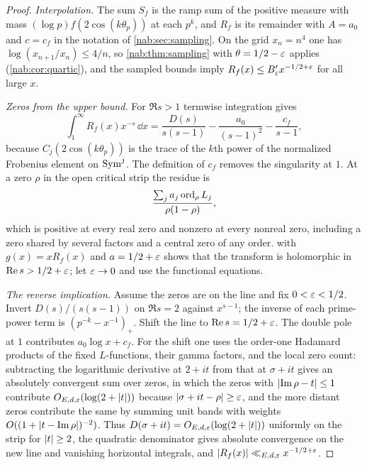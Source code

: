 \begin{proof}
\emph{Interpolation.} The sum $S_f$ is the ramp sum of the positive measure with mass
$(\log p)f(2\cos(k\theta_p))$ at each $p^k$, and $R_f$ is its remainder with $A=a_0$ and $c=c_f$ in
the notation of \cref{nab:sec:sampling}. On the grid $x_n=n^4$ one has $\log(x_{n+1}/x_n)\le4/n$, so
\cref{nab:thm:sampling} with $\theta=1/2-\varepsilon$ applies (\cref{nab:cor:quartic}), and the sampled bounds
imply $R_f(x)\le B'_\varepsilon x^{-1/2+\varepsilon}$ for all large $x$.

\emph{Zeros from the upper bound.} For $\Re s>1$ termwise integration gives
\begin{equation}\label{hec:eq:symmellin}
 \int_1^\infty R_f(x)x^{-s}\,\dd x=\frac{D(s)}{s(s-1)}-\frac{a_0}{(s-1)^2}-\frac{c_f}{s-1},
\end{equation}
because $C_j(2\cos(k\theta_p))$ is the trace of the $k$th power of the normalized Frobenius element on
$\operatorname{Sym}^j$. The definition of $c_f$ removes the singularity at $1$. At a zero $\rho$ in the open critical
strip the residue is
\[
 \frac{\sum_ja_j\operatorname{ord}_\rho L_j}{\rho(1-\rho)},
\]
which is positive at every real zero and nonzero at every nonreal zero, including a zero shared by several
factors and a central zero of any order.  with $g(x)=xR_f(x)$ and $a=1/2+\varepsilon$ shows
that the transform is holomorphic in $\operatorname{Re} s>1/2+\varepsilon$; let $\varepsilon\to0$ and use the functional equations.

\emph{The reverse implication.} Assume the zeros are on the line and fix $0<\varepsilon<1/2$. Invert
$D(s)/(s(s-1))$ on $\Re s=2$ against $x^{s-1}$; the inverse of each prime-power term is
$(p^{-k}-x^{-1})_+$. Shift the line to $\operatorname{Re} s=1/2+\varepsilon$. The double pole at $1$ contributes
$a_0\log x+c_f$. For the shift one uses the order-one Hadamard products of the fixed $L$-functions, their
gamma factors, and the local zero count: subtracting the logarithmic derivative at $2+it$ from that at
$\sigma+it$ gives an absolutely convergent sum over zeros, in which the zeros with $\lvert\operatorname{Im}\rho-t\rvert\le1$
contribute $O_{E,d,\varepsilon}(\log(2+\lvert t\rvert))$ because $\lvert\sigma+it-\rho\rvert\ge\varepsilon$, and the more distant zeros
contribute the same by summing unit bands with weights $O((1+\lvert t-\operatorname{Im}\rho\rvert)^{-2})$. Thus
$D(\sigma+it)=O_{E,d,\varepsilon}(\log(2+\lvert t\rvert))$ uniformly on the strip for $\lvert t\rvert\ge2$, the quadratic
denominator gives absolute convergence on the new line and vanishing horizontal integrals, and
$\lvert R_f(x)\rvert\ll_{E,d,\varepsilon}x^{-1/2+\varepsilon}$.
\end{proof}

